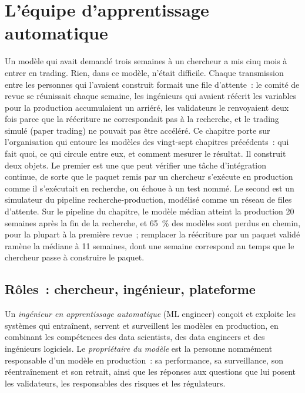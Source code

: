 \chapter{L'équipe d'apprentissage automatique}\label{ch:ml:the-machine-learning-team}

Un modèle qui avait demandé trois semaines à un chercheur a mis cinq mois à entrer en trading. Rien, dans ce modèle, n'était difficile. Chaque transmission entre les
personnes qui l'avaient construit formait une file d'attente~: le comité de revue se réunissait chaque semaine, les ingénieurs qui avaient réécrit les variables pour la production accumulaient un arriéré, les
validateurs le renvoyaient deux fois parce que la réécriture ne correspondait pas à la recherche, et le trading simulé (paper trading) ne pouvait pas être
accéléré. Ce chapitre porte sur l'organisation qui entoure les modèles des vingt-sept chapitres précédents~: qui fait quoi, ce qui
circule entre eux, et comment mesurer le résultat. Il construit deux objets. Le premier est une  que peut vérifier une
tâche d'intégration continue, de sorte que le paquet remis par un chercheur s'exécute en production comme il s'exécutait en recherche, ou
échoue à un test nommé. Le second est un simulateur du pipeline recherche-production, modélisé comme un réseau de files d'attente. Sur le pipeline du
chapitre, le modèle médian atteint la production 20 semaines après la fin de la recherche, et 65~\% des modèles sont perdus en chemin, pour la plupart à la
première revue~; remplacer la réécriture par un paquet validé ramène la médiane à 11 semaines, dont une semaine correspond au temps que le chercheur passe
à construire le paquet.

\section{Rôles~: chercheur, ingénieur, plateforme}

\begin{definition}\label{def:ml:the-machine-learning-team:roles}
Un \emph{ingénieur en apprentissage automatique} (ML engineer) conçoit et exploite les systèmes qui entraînent, servent et surveillent
les modèles en production, en combinant les compétences des data scientists, des data engineers et des ingénieurs logiciels. Le \emph{propriétaire du
modèle} est la personne nommément responsable d'un modèle en production~: sa performance, sa surveillance, son
réentraînement et son retrait, ainsi que les réponses aux questions que lui posent les validateurs, les responsables des risques et les régulateurs.
\end{definition}

